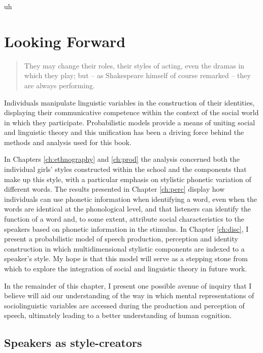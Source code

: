 uh\chapter{Looking Forward}
\label{ch:concl}


\begin{quote}
	They may change their roles, their styles of acting, even the dramas in which they play; but -- as Shakespeare himself of course remarked -- they are always performing. \cite[35-36]{geertz1973}
\end{quote} 

\noindent Individuals manipulate linguistic variables in the construction of their identities, displaying their communicative competence within the context of the social world in which they participate.  Probabilistic models provide a means of uniting social and linguistic theory and this unification has been a driving force behind the methods and analysis used for this book.  

In Chapters \ref{ch:ethnography} and \ref{ch:prod} the analysis concerned both the individual girls' styles constructed within the school and the components that make up this style, with a particular emphasis on stylistic phonetic variation of different words.  The results presented in Chapter \ref{ch:perc} display how individuals can use phonetic information when identifying a word, even when the words are identical at the phonological level, and that listeners can identify the function of a word and, to some extent, attribute social characteristics to the speakers based on phonetic information in the stimulus.  In Chapter \ref{ch:disc}, I present a probabilistic model of speech production, perception and identity construction in which multidimensional stylistic components are indexed to a speaker's style.  My hope is that this model will serve as a stepping stone from which to explore the integration of social and linguistic theory in future work.  

In the remainder of this chapter, I present one possible avenue of inquiry that I believe will aid our understanding of the way in which mental representations of sociolinguistic variables are accessed during the production and perception of speech, ultimately leading to a better understanding of human cognition.

 

\section{Speakers as style-creators}

